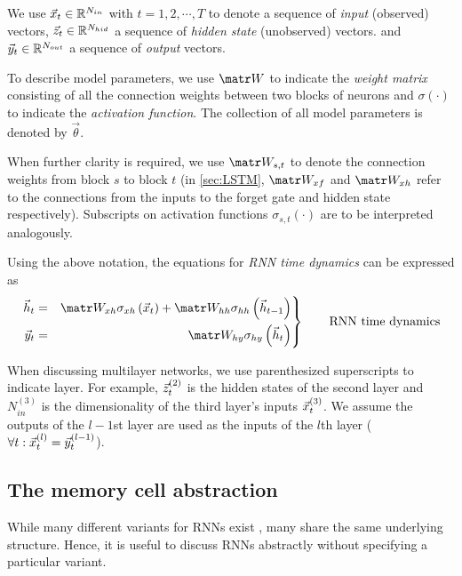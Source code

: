 We use $\vec{x}_t \in \mathbb{R}^{N_{in}}$ with $t=1,2,\cdots,T$ to denote a sequence of
\emph{input} (\ie observed) vectors, $\vec{z}_t \in \mathbb{R}^{N_{hid}}$ a sequence of
\emph{hidden state} (\ie unobserved) vectors. and $\vec{y}_t \in \mathbb{R}^{N_{out}}$ a
sequence of \emph{output} vectors.

To describe model parameters, we use $\W$ to indicate the \emph{weight matrix}
consisting of all the connection weights between two blocks of neurons
and $\sigma(\cdot)$ to indicate the \emph{activation function}. The collection
of all model parameters is denoted by $\vec{\theta}$.

When further clarity is required, we use $\W_{s,t}$ to denote the connection
weights from block $s$ to block $t$ (\ie in \cref{sec:LSTM}, $\W_{xf}$ and
$\W_{xh}$ refer to the connections from the inputs to the forget gate and
hidden state respectively). Subscripts on activation functions $\sigma_{s,t}(\cdot)$
are to be interpreted analogously.

Using the above notation, the equations for \emph{RNN time dynamics} can be expressed as
\begin{equation}\label{eq:rnn-dynamics}
 \left.\begin{aligned}
          \h_t &=& \W_{xh} \sigma_{xh} \left( \x_t \right) + \W_{hh} \sigma_{hh} \left( \h_{t-1} \right)\\
          \y_t &=& \W_{hy} \sigma_{hy} \left( \h_t \right)
       \end{aligned}
 \right\}
 \qquad \text{RNN time dynamics}
\end{equation}

When discussing multilayer networks, we use parenthesized superscripts to
indicate layer. For example, $\vec{z}^{(2)}_t$ is the hidden states of the second
layer and $N^{(3)}_{in}$ is the dimensionality of the third layer's inputs
$\vec{x}^{(3)}_t$. We assume the outputs of the $l-1$st layer are used as the inputs
of the $l$th layer (\ie $\forall t: \vec{x}^{(l)}_t = \vec{y}^{(l-1)}_t$).

\subsection{The memory cell abstraction}

While many different variants for RNNs exist
\citep{elman1990finding,jordan1997serial,hochreiter1997long,cho2014learning,Koutnik2014,Mikolov2015},
many share the same underlying structure. Hence, it is useful to discuss RNNs
abstractly without specifying a particular variant.

